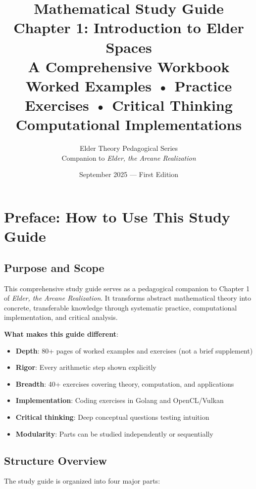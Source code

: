 \documentclass[12pt,a4paper,openany]{book}
\title{\textbf{Mathematical Study Guide}\\[0.5cm]
\LARGE{Chapter 1: Introduction to Elder Spaces}\\[1cm]
\Large{A Comprehensive Workbook}\\
\large{Worked Examples • Practice Exercises • Critical Thinking}\\[0.5cm]
\large{Computational Implementations}}
\author{Elder Theory Pedagogical Series\\[0.3cm]
\large{Companion to \textit{Elder, the Arcane Realization}}}
\date{September 2025 — First Edition}
\theoremstyle{definition}
\theoremstyle{remark}
\begin{document}
\frontmatter
\maketitle

\tableofcontents
\listoffigures
\listoftables

\chapter*{Preface: How to Use This Study Guide}

\section*{Purpose and Scope}

This comprehensive study guide serves as a pedagogical companion to Chapter 1 of \textit{Elder, the Arcane Realization}. It transforms abstract mathematical theory into concrete, transferable knowledge through systematic practice, computational implementation, and critical analysis.

\textbf{What makes this guide different}:
\begin{itemize}
\item \textbf{Depth}: 80+ pages of worked examples and exercises (not a brief supplement)
\item \textbf{Rigor}: Every arithmetic step shown explicitly  
\item \textbf{Breadth}: 40+ exercises covering theory, computation, and applications
\item \textbf{Implementation}: Coding exercises in Golang and OpenCL/Vulkan
\item \textbf{Critical thinking}: Deep conceptual questions testing intuition
\item \textbf{Modularity}: Parts can be studied independently or sequentially
\end{itemize}

\section*{Structure Overview}

The study guide is organized into four major parts:
\end{document}
